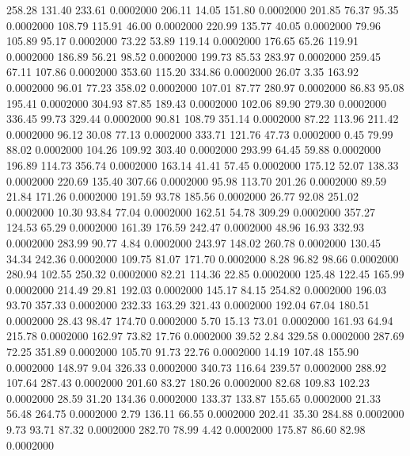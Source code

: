  258.28  131.40  233.61   0.0002000
 206.11   14.05  151.80   0.0002000
 201.85   76.37   95.35   0.0002000
 108.79  115.91   46.00   0.0002000
 220.99  135.77   40.05   0.0002000
  79.96  105.89   95.17   0.0002000
  73.22   53.89  119.14   0.0002000
 176.65   65.26  119.91   0.0002000
 186.89   56.21   98.52   0.0002000
 199.73   85.53  283.97   0.0002000
 259.45   67.11  107.86   0.0002000
 353.60  115.20  334.86   0.0002000
  26.07    3.35  163.92   0.0002000
  96.01   77.23  358.02   0.0002000
 107.01   87.77  280.97   0.0002000
  86.83   95.08  195.41   0.0002000
 304.93   87.85  189.43   0.0002000
 102.06   89.90  279.30   0.0002000
 336.45   99.73  329.44   0.0002000
  90.81  108.79  351.14   0.0002000
  87.22  113.96  211.42   0.0002000
  96.12   30.08   77.13   0.0002000
 333.71  121.76   47.73   0.0002000
   0.45   79.99   88.02   0.0002000
 104.26  109.92  303.40   0.0002000
 293.99   64.45   59.88   0.0002000
 196.89  114.73  356.74   0.0002000
 163.14   41.41   57.45   0.0002000
 175.12   52.07  138.33   0.0002000
 220.69  135.40  307.66   0.0002000
  95.98  113.70  201.26   0.0002000
  89.59   21.84  171.26   0.0002000
 191.59   93.78  185.56   0.0002000
  26.77   92.08  251.02   0.0002000
  10.30   93.84   77.04   0.0002000
 162.51   54.78  309.29   0.0002000
 357.27  124.53   65.29   0.0002000
 161.39  176.59  242.47   0.0002000
  48.96   16.93  332.93   0.0002000
 283.99   90.77    4.84   0.0002000
 243.97  148.02  260.78   0.0002000
 130.45   34.34  242.36   0.0002000
 109.75   81.07  171.70   0.0002000
   8.28   96.82   98.66   0.0002000
 280.94  102.55  250.32   0.0002000
  82.21  114.36   22.85   0.0002000
 125.48  122.45  165.99   0.0002000
 214.49   29.81  192.03   0.0002000
 145.17   84.15  254.82   0.0002000
 196.03   93.70  357.33   0.0002000
 232.33  163.29  321.43   0.0002000
 192.04   67.04  180.51   0.0002000
  28.43   98.47  174.70   0.0002000
   5.70   15.13   73.01   0.0002000
 161.93   64.94  215.78   0.0002000
 162.97   73.82   17.76   0.0002000
  39.52    2.84  329.58   0.0002000
 287.69   72.25  351.89   0.0002000
 105.70   91.73   22.76   0.0002000
  14.19  107.48  155.90   0.0002000
 148.97    9.04  326.33   0.0002000
 340.73  116.64  239.57   0.0002000
 288.92  107.64  287.43   0.0002000
 201.60   83.27  180.26   0.0002000
  82.68  109.83  102.23   0.0002000
  28.59   31.20  134.36   0.0002000
 133.37  133.87  155.65   0.0002000
  21.33   56.48  264.75   0.0002000
   2.79  136.11   66.55   0.0002000
 202.41   35.30  284.88   0.0002000
   9.73   93.71   87.32   0.0002000
 282.70   78.99    4.42   0.0002000
 175.87   86.60   82.98   0.0002000
